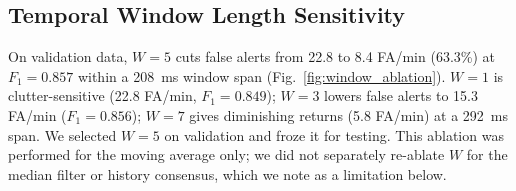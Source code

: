 \documentclass[conference]{IEEEtran}
\begin{document}
\begin{table}[!t]
\centering
\caption{Environment-Stratified Causal Decision Performance on Held-Out Test Split (8 Tiles per Biome, 5,570 Total Frames)}
\label{tab:per_biome_benchmark}
\end{table}

\subsection{Temporal Window Length Sensitivity}
On validation data, $W=5$ cuts false alerts from 22.8 to 8.4 FA/min (63.3\%) at $F_1=0.857$ within a 208~ms window span (Fig.~\ref{fig:window_ablation}). $W=1$ is clutter-sensitive (22.8 FA/min, $F_1=0.849$); $W=3$ lowers false alerts to 15.3 FA/min ($F_1=0.856$); $W=7$ gives diminishing returns (5.8 FA/min) at a 292~ms span. We selected $W=5$ on validation and froze it for testing. This ablation was performed for the moving average only; we did not separately re-ablate $W$ for the median filter or history consensus, which we note as a limitation below.
\end{document}
